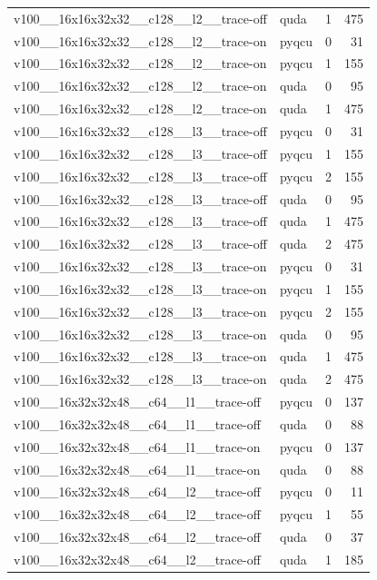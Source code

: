 \begin{table}[htbp]
\begin{tabular}{@{}llrr@{}}
v100\_\_16x16x32x32\_\_c128\_\_l2\_\_trace-off & quda & 1 & 475 \\
v100\_\_16x16x32x32\_\_c128\_\_l2\_\_trace-on & pyqcu & 0 & 31 \\
v100\_\_16x16x32x32\_\_c128\_\_l2\_\_trace-on & pyqcu & 1 & 155 \\
v100\_\_16x16x32x32\_\_c128\_\_l2\_\_trace-on & quda & 0 & 95 \\
v100\_\_16x16x32x32\_\_c128\_\_l2\_\_trace-on & quda & 1 & 475 \\
v100\_\_16x16x32x32\_\_c128\_\_l3\_\_trace-off & pyqcu & 0 & 31 \\
v100\_\_16x16x32x32\_\_c128\_\_l3\_\_trace-off & pyqcu & 1 & 155 \\
v100\_\_16x16x32x32\_\_c128\_\_l3\_\_trace-off & pyqcu & 2 & 155 \\
v100\_\_16x16x32x32\_\_c128\_\_l3\_\_trace-off & quda & 0 & 95 \\
v100\_\_16x16x32x32\_\_c128\_\_l3\_\_trace-off & quda & 1 & 475 \\
v100\_\_16x16x32x32\_\_c128\_\_l3\_\_trace-off & quda & 2 & 475 \\
v100\_\_16x16x32x32\_\_c128\_\_l3\_\_trace-on & pyqcu & 0 & 31 \\
v100\_\_16x16x32x32\_\_c128\_\_l3\_\_trace-on & pyqcu & 1 & 155 \\
v100\_\_16x16x32x32\_\_c128\_\_l3\_\_trace-on & pyqcu & 2 & 155 \\
v100\_\_16x16x32x32\_\_c128\_\_l3\_\_trace-on & quda & 0 & 95 \\
v100\_\_16x16x32x32\_\_c128\_\_l3\_\_trace-on & quda & 1 & 475 \\
v100\_\_16x16x32x32\_\_c128\_\_l3\_\_trace-on & quda & 2 & 475 \\
v100\_\_16x32x32x48\_\_c64\_\_l1\_\_trace-off & pyqcu & 0 & 137 \\
v100\_\_16x32x32x48\_\_c64\_\_l1\_\_trace-off & quda & 0 & 88 \\
v100\_\_16x32x32x48\_\_c64\_\_l1\_\_trace-on & pyqcu & 0 & 137 \\
v100\_\_16x32x32x48\_\_c64\_\_l1\_\_trace-on & quda & 0 & 88 \\
v100\_\_16x32x32x48\_\_c64\_\_l2\_\_trace-off & pyqcu & 0 & 11 \\
v100\_\_16x32x32x48\_\_c64\_\_l2\_\_trace-off & pyqcu & 1 & 55 \\
v100\_\_16x32x32x48\_\_c64\_\_l2\_\_trace-off & quda & 0 & 37 \\
v100\_\_16x32x32x48\_\_c64\_\_l2\_\_trace-off & quda & 1 & 185 \\

\end{tabular}
\end{table}
